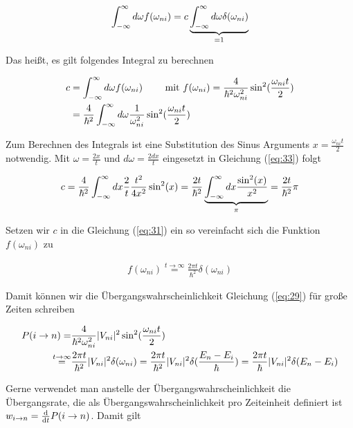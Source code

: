 \begin{align}
  \label{eq:32}
  \int_{-\infty}^\infty d\omega f(\omega_{ni}) = c \underbr{ \int_{-\infty}^\infty d\omega \delta(\omega_{ni}) }_{=1}
\end{align}

Das heißt, es gilt folgendes Integral zu berechnen

\begin{align}
  \label{eq:33}
  c &= \int_{-\infty}^\infty d\omega f(\omega_{ni}) \qquad \text{ mit } f(\omega_{ni})=\frac{4}{\hbar^2\omega_{ni}^2}\sin^2(\frac{\omega_{ni} t}{2}) \notag\\
&=\frac{4}{\hbar^2} \int_{-\infty}^\infty d\omega \frac{1}{\omega_{ni}^2}\sin^2(\frac{\omega_{ni} t}{2})
\end{align}

Zum Berechnen des Integrals ist eine Substitution des Sinus Arguments \(x= \frac{\omega_{ni} t}{2}\)  notwendig. Mit \(\omega = \frac{2x}{t} \) und \(d\omega = \frac{2dx}{t}\) eingesetzt in Gleichung (\ref{eq:33}) folgt

\begin{align}
  \label{eq:34}
  c = \frac{4}{\hbar^2} \int_{-\infty}^\infty dx \frac{2}{t} \frac{t^2}{4x^2}\sin^2(x) = \frac{2t}{\hbar^2} \underbr{\int_{-\infty}^\infty dx \frac{\sin^2(x)}{x^2}}_{\pi} = \frac{2t}{\hbar^2} \pi
\end{align}

Setzen wir \(c\) in die Gleichung (\ref{eq:31}) ein so vereinfacht sich die Funktion \(f(\omega_{ni})\) zu

\begin{align}
  \label{eq:35}
  f(\omega_{ni}) \stackrel{t \to \infty}= \frac{2\pi t}{\hbar^2} \delta(\omega_{ni})
\end{align}

Damit können wir die Übergangswahrscheinlichkeit Gleichung (\ref{eq:29}) für große Zeiten schreiben

\begin{align}
  \label{eq:36}
   P(i\rightarrow n) =& \frac{4}{\hbar^2\omega_{ni}^2}|V_{ni}|^2\sin^2(\frac{\omega_{ni} t}{2}) \notag\\
\stackrel{t\to\infty}=& \frac{2\pi t}{\hbar^2} |V_{ni}|^2  \delta(\omega_{ni}) = \frac{2\pi t}{\hbar^2} |V_{ni}|^2  \delta(\frac{E_n-E_i}{\hbar}) = \frac{2\pi t}{\hbar} |V_{ni}|^2  \delta(E_n-E_i)
\end{align}

Gerne verwendet man anstelle der Übergangswahrscheinlichkeit die Übergangsrate, die als Übergangswahrscheinlichkeit pro Zeiteinheit definiert ist \(w_{i\to n}= \diff_t P(i\rightarrow n)\). Damit gilt

